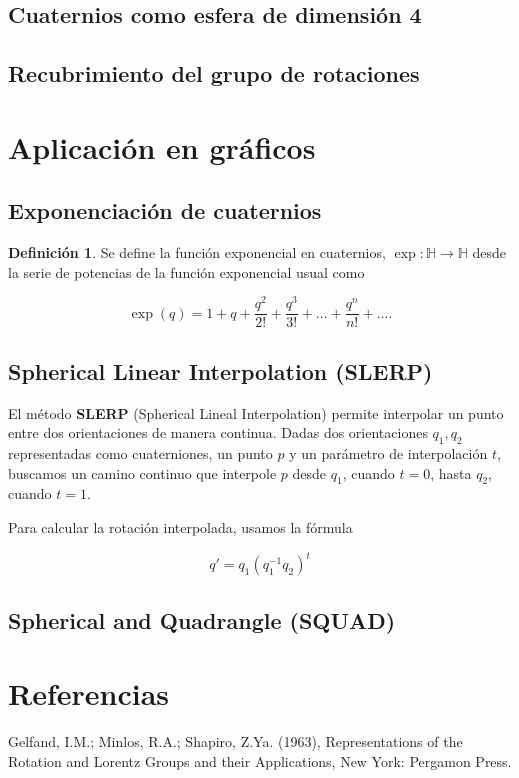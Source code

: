 \documentclass{article}
\theoremstyle{plain}
\theoremstyle{definition}
\newtheorem{definition}{Definición}
\theoremstyle{remark}
\begin{document}
\subsection{Cuaternios como esfera de dimensión 4}
\subsection{Recubrimiento del grupo de rotaciones}


\section{Aplicación en gráficos}

\subsection{Exponenciación de cuaternios}
\begin{definition}
  Se define la función exponencial en cuaternios, $\exp \colon \mathbb{H} \to \mathbb{H}$ desde
  la serie de potencias de la función exponencial usual como

  \[
    \exp(q) =  1 + q + \frac{q^2}{2!} + \frac{q^3}{3!} + \dots + \frac{q^n}{n!} + \dots .
  \]
\end{definition}

\subsection{Spherical Linear Interpolation (SLERP)}
El método \textbf{SLERP} (Spherical Lineal Interpolation) permite interpolar
un punto entre dos orientaciones de manera continua. Dadas dos orientaciones
$q_1,q_2$ representadas como cuaterniones, un punto $p$ y un parámetro de
interpolación $t$, buscamos un camino continuo que interpole $p$ desde $q_1$,
cuando $t=0$, hasta $q_2$, cuando $t=1$.

Para calcular la rotación interpolada, usamos la fórmula

\[q' = q_1(q_1^{-1}q_2)^t\]

\subsection{Spherical and Quadrangle (SQUAD)}


\section{Referencias}

\begin{thebibliography}{9}

  Gelfand, I.M.; Minlos, R.A.; Shapiro, Z.Ya. (1963),
  Representations of the Rotation and Lorentz Groups and their Applications,
  New York: Pergamon Press.

\end{thebibliography}
\end{document}
